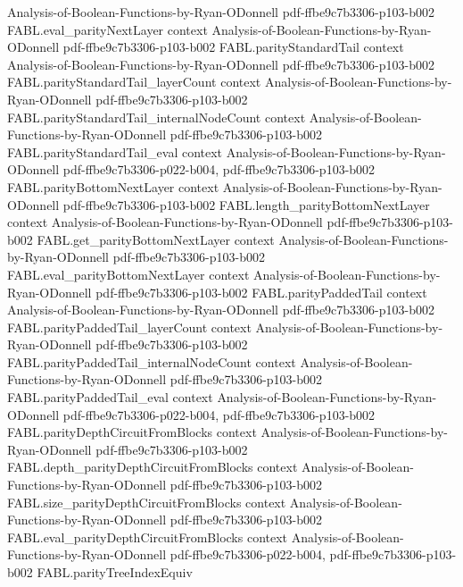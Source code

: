 \begin{theorem}
  {Analysis-of-Boolean-Functions-by-Ryan-ODonnell}
  {pdf-ffbe9c7b3306-p103-b002}
\proofstep
  {FABL.eval_parityNextLayer}
  {context}
  {Analysis-of-Boolean-Functions-by-Ryan-ODonnell}
  {pdf-ffbe9c7b3306-p103-b002}
\proofstep
  {FABL.parityStandardTail}
  {context}
  {Analysis-of-Boolean-Functions-by-Ryan-ODonnell}
  {pdf-ffbe9c7b3306-p103-b002}
\proofstep
  {FABL.parityStandardTail_layerCount}
  {context}
  {Analysis-of-Boolean-Functions-by-Ryan-ODonnell}
  {pdf-ffbe9c7b3306-p103-b002}
\proofstep
  {FABL.parityStandardTail_internalNodeCount}
  {context}
  {Analysis-of-Boolean-Functions-by-Ryan-ODonnell}
  {pdf-ffbe9c7b3306-p103-b002}
\proofstep
  {FABL.parityStandardTail_eval}
  {context}
  {Analysis-of-Boolean-Functions-by-Ryan-ODonnell}
  {pdf-ffbe9c7b3306-p022-b004,
    pdf-ffbe9c7b3306-p103-b002}
\proofstep
  {FABL.parityBottomNextLayer}
  {context}
  {Analysis-of-Boolean-Functions-by-Ryan-ODonnell}
  {pdf-ffbe9c7b3306-p103-b002}
\proofstep
  {FABL.length_parityBottomNextLayer}
  {context}
  {Analysis-of-Boolean-Functions-by-Ryan-ODonnell}
  {pdf-ffbe9c7b3306-p103-b002}
\proofstep
  {FABL.get_parityBottomNextLayer}
  {context}
  {Analysis-of-Boolean-Functions-by-Ryan-ODonnell}
  {pdf-ffbe9c7b3306-p103-b002}
\proofstep
  {FABL.eval_parityBottomNextLayer}
  {context}
  {Analysis-of-Boolean-Functions-by-Ryan-ODonnell}
  {pdf-ffbe9c7b3306-p103-b002}
\proofstep
  {FABL.parityPaddedTail}
  {context}
  {Analysis-of-Boolean-Functions-by-Ryan-ODonnell}
  {pdf-ffbe9c7b3306-p103-b002}
\proofstep
  {FABL.parityPaddedTail_layerCount}
  {context}
  {Analysis-of-Boolean-Functions-by-Ryan-ODonnell}
  {pdf-ffbe9c7b3306-p103-b002}
\proofstep
  {FABL.parityPaddedTail_internalNodeCount}
  {context}
  {Analysis-of-Boolean-Functions-by-Ryan-ODonnell}
  {pdf-ffbe9c7b3306-p103-b002}
\proofstep
  {FABL.parityPaddedTail_eval}
  {context}
  {Analysis-of-Boolean-Functions-by-Ryan-ODonnell}
  {pdf-ffbe9c7b3306-p022-b004,
    pdf-ffbe9c7b3306-p103-b002}
\proofstep
  {FABL.parityDepthCircuitFromBlocks}
  {context}
  {Analysis-of-Boolean-Functions-by-Ryan-ODonnell}
  {pdf-ffbe9c7b3306-p103-b002}
\proofstep
  {FABL.depth_parityDepthCircuitFromBlocks}
  {context}
  {Analysis-of-Boolean-Functions-by-Ryan-ODonnell}
  {pdf-ffbe9c7b3306-p103-b002}
\proofstep
  {FABL.size_parityDepthCircuitFromBlocks}
  {context}
  {Analysis-of-Boolean-Functions-by-Ryan-ODonnell}
  {pdf-ffbe9c7b3306-p103-b002}
\proofstep
  {FABL.eval_parityDepthCircuitFromBlocks}
  {context}
  {Analysis-of-Boolean-Functions-by-Ryan-ODonnell}
  {pdf-ffbe9c7b3306-p022-b004,
    pdf-ffbe9c7b3306-p103-b002}
\proofstep
  {FABL.parityTreeIndexEquiv}

\end{theorem}
